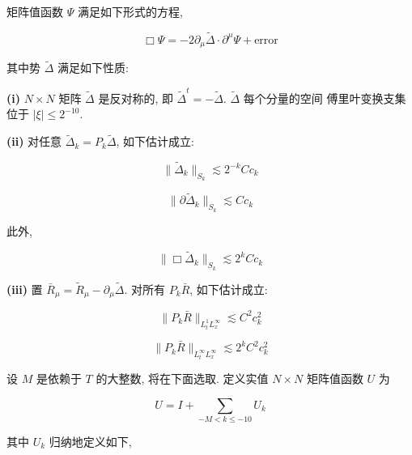 \begin{proposition}\label{prop:cG-2.27}
矩阵值函数 $\Psi$ 满足如下形式的方程, 

\begin{equation}
\Box \Psi = - 2 \partial_ {\mu} \tilde {\Delta} \cdot \partial^ {\mu} \Psi + \mathrm{error}\label{eq:cG-44}
\end{equation}

其中势 $\tilde{\Delta}$ 满足如下性质:

\textbf{(i)} $N\times N$ 矩阵 $\tilde{\Delta}$ 是反对称的, 即 $\tilde{\Delta}^t = -\tilde{\Delta}$. $\tilde{\Delta}$ 每个分量的空间 傅里叶变换支集位于 $|\xi |\leq 2^{-10}$. 

\textbf{(ii)} 对任意 $\tilde{\Delta}_k = P_k\tilde{\Delta}$, 如下估计成立:

\begin{equation}
\| \tilde {\Delta} _ {k} \| _ {S _ {k}} \lesssim 2 ^ {- k} C c _ {k}\label{eq:cG-45}
\end{equation}

\begin{equation}
\| \partial \tilde {\Delta} _ {k} \| _ {S _ {k}} \lesssim C c _ {k}\label{eq:cG-46}
\end{equation}

此外, 

\begin{equation}
\| \Box \tilde {\Delta} _ {k} \| _ {S _ {k}} \lesssim 2 ^ {k} C c _ {k}\label{eq:cG-47}
\end{equation}

\textbf{(iii)} 置 $\bar{R}_{\mu} = \tilde{R}_{\mu} - \partial_{\mu}\tilde{\Delta}$. 对所有 $P_{k}\bar{R}$, 如下估计成立:

\[
\| P _ {k} \bar {R} \| _ {L _ {t} ^ {1} L _ {x} ^ {\infty}} \lesssim C ^ {2} c _ {k} ^ {2}
\]

\begin{equation}
\| P _ {k} \bar {R} \| _ {L _ {t} ^ {\infty} L _ {x} ^ {\infty}} \lesssim 2 ^ {k} C ^ {2} c _ {k} ^ {2}\label{eq:cG-48}
\end{equation}
\end{proposition}

设 $M$ 是依赖于 $T$ 的大整数, 将在下面选取. 定义实值 $N \times N$ 矩阵值函数 $U$ 为

\begin{equation}
U = I + \sum_ {- M < k \leq -10} U _ {k}\label{eq:cG-49}
\end{equation}

其中 $U_{k}$ 归纳地定义如下, 

